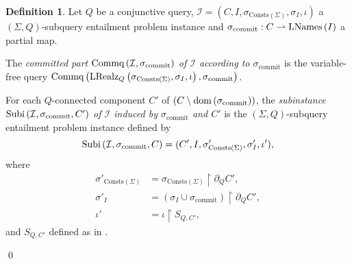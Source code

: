 \documentclass[12pt]{report}
\theoremstyle{plain}
\theoremstyle{definition}
\newtheorem{definition}[theorem]{Definition}
\def\Consts{{\mathrm{Consts}}}
\newcommand{\dom}[1]{\ensuremath{\normalfont{\operatorname{dom}} \left( #1 \right)}}
\newcommand{\Subi}[3]{\ensuremath{\normalfont{\textrm{Subi}} \left( #1, #2, #3 \right)}}
\newcommand{\Commq}[2]{\ensuremath{\normalfont{\textrm{Commq}} \left( #1, #2 \right)}}
\newcommand{\LNames}[1]{\ensuremath{\normalfont{\textrm{LNames}} \left( #1 \right)}}
\newcommand{\LRealz}[2]{\ensuremath{\normalfont{\textrm{LRealz}}_{ #1 } \left( #2 \right)}}
\begin{document}
\begin{definition}
\label{definition:subquery-entailment-problem-splitting}
  Let $Q$ be a conjunctive query, $\mathcal{I} = (C, I, \sigma_{\Consts(\Sigma)}, \sigma_I, \iota)$ a $(\Sigma, Q)$-subquery entailment problem instance and $\sigma_{\mathrm{commit}}: C \rightharpoonup \LNames{I}$ a partial map.

  The \emph{committed part $\Commq{\mathcal{I}}{\sigma_{\mathrm{commit}}}$ of $\mathcal{I}$ according to $\sigma_{\mathrm{commit}}$} is the variable-free query $\Commq{\LRealz{Q}{\sigma_{\Consts(\Sigma)}, \sigma_I, \iota}}{\sigma_{\mathrm{commit}}}$.

  For each $Q$-connected component $C'$ of $(C \setminus \dom{\sigma_{\mathrm{commit}}})$, the \emph{subinstance $\Subi{\mathcal{I}}{\sigma_{\mathrm{commit}}}{C'}$ of $\mathcal{I}$ induced by $\sigma_{\mathrm{commit}}$ and $C'$} is the $(\Sigma, Q)$-subquery entailment problem instance defined by
  $$\Subi{\mathcal{I}}{\sigma_{\mathrm{commit}}}{C} = (C', I, \sigma'_{\Consts(\Sigma)}, \sigma'_I, \iota'),$$
  where \begin{align*}
    \sigma'_{\Consts(\Sigma)} &= \sigma_{\Consts(\Sigma)} \upharpoonright \partial_Q C', \\
    \sigma'_I &= (\sigma_I \cup \sigma_{\mathrm{commit}}) \upharpoonright \partial_Q C', \\
    \iota' &= \iota \upharpoonright S_{Q, C'},
  \end{align*}
  and $S_{Q, C'}$ defined as in .

  \qed
\end{definition}
\end{document}

